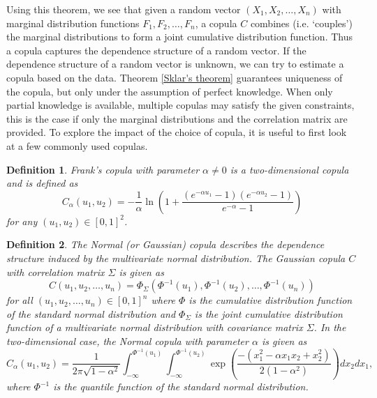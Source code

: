 \documentclass{article}
\newtheorem{definition}{Definition}
\begin{document}
Using this theorem, we see that given a random vector $(X_1,X_2,\dots,X_n)$ with marginal distribution functions $F_1,F_2,\dots,F_n$, a copula $C$ combines (i.e. `couples')  the marginal distributions to form a joint cumulative distribution function. Thus a copula captures the dependence structure of a random vector. If the dependence structure of a random vector is unknown, we can try to estimate a copula based on the data. Theorem \ref{Sklar's theorem} guarantees uniqueness of the copula, but only under the assumption of perfect knowledge. When only partial knowledge is available, multiple copulas may satisfy the given constraints, this is the case if only the marginal distributions and the correlation matrix are provided. To explore the impact of the choice of copula, it is useful to first look at a few commonly used copulas.
\\
\begin{definition}\cite[Example 3.4.4]{Risk_Measurement}
    Frank's copula with parameter $\alpha\neq 0$ is a two-dimensional copula and is defined as
    $$C_\alpha(u_1,u_2) = -\frac{1}{\alpha}\ln\left(1+\frac{\left(e^{-\alpha u_1} - 1\right)\left(e^{-\alpha u_2} - 1\right)}{e^{-\alpha} - 1}\right)$$
    for any $(u_1,u_2)\in [0,1]^2$.
\end{definition}
\begin{definition}\cite[Section 2.1]{Copulas}\label{def: Gaussian copula}
    The Normal (or Gaussian) copula describes the dependence structure induced by the multivariate normal distribution. The Gaussian copula $C$ with correlation matrix $\Sigma$ is given as
    $$C(u_1,u_2,\dots,u_n) = \Phi_\Sigma(\Phi^{-1}(u_1),\Phi^{-1}(u_2),\dots,\Phi^{-1}(u_n))$$
    for all $(u_1,u_2,\dots,u_n)\in [0,1]^n$ where $\Phi$ is the cumulative distribution function of the standard normal distribution and $\Phi_\Sigma$ is the joint cumulative distribution function of a multivariate normal distribution with covariance matrix $\Sigma$.
    In the two-dimensional case, the Normal copula with parameter $\alpha$ is given as
    $$C_\alpha(u_1,u_2) = \frac{1}{2\pi \sqrt{1-\alpha^2}}\int_{-\infty}^{\Phi^{-1}(u_1)}\int_{-\infty}^{\Phi^{-1}(u_2)}\exp\left(\frac{-(x_1^2 - \alpha x_1 x_2 + x_2^2)}{2(1-\alpha^2)}\right)d{x_2}d{x_1},$$
    where $\Phi^{-1}$ is the quantile function of the standard normal distribution.
\end{definition}
\end{document}
